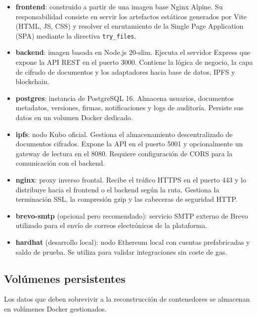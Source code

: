 \documentclass[11pt, a4paper]{article}
\begin{document}
\begin{itemize}[leftmargin=*]
    \item \textbf{frontend}: construido a partir de una imagen base Nginx Alpine. Su responsabilidad consiste en servir los artefactos est\'{a}ticos generados por Vite (HTML, JS, CSS) y resolver el enrutamiento de la Single Page Application (SPA) mediante la directiva \texttt{try\_files}.
    \item \textbf{backend}: imagen basada en Node.js 20-slim. Ejecuta el servidor Express que expone la API REST en el puerto 3000. Contiene la l\'{o}gica de negocio, la capa de cifrado de documentos y los adaptadores hacia base de datos, IPFS y blockchain.
    \item \textbf{postgres}: instancia de PostgreSQL 16. Almacena usuarios, documentos metadatos, versiones, firmas, notificaciones y logs de auditor\'{i}a. Persiste sus datos en un volumen Docker dedicado.
    \item \textbf{ipfs}: nodo Kubo oficial. Gestiona el almacenamiento descentralizado de documentos cifrados. Expone la API en el puerto 5001 y opcionalmente un gateway de lectura en el 8080. Requiere configuraci\'{o}n de CORS para la comunicaci\'{o}n con el backend.
    \item \textbf{nginx}: proxy inverso frontal. Recibe el tr\'{a}fico HTTPS en el puerto 443 y lo distribuye hacia el frontend o el backend seg\'{u}n la ruta. Gestiona la terminaci\'{o}n SSL, la compresi\'{o}n gzip y las cabeceras de seguridad HTTP.
    \item \textbf{brevo-smtp} (opcional pero recomendado): servicio SMTP externo de Brevo utilizado para el env\'{i}o de correos electr\'{o}nicos de la plataforma.
    \item \textbf{hardhat} (desarrollo local): nodo Ethereum local con cuentas prefabricadas y saldo de prueba. Se utiliza para validar integraciones sin coste de gas.
\end{itemize}

\subsection{Vol\'{u}menes persistentes}

Los datos que deben sobrevivir a la reconstrucci\'{o}n de contenedores se almacenan en vol\'{u}menes Docker gestionados.
\end{document}
